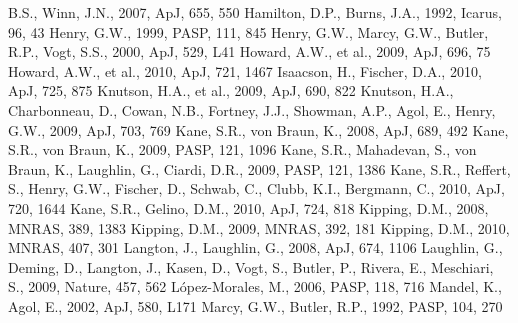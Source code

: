 \documentclass[12pt,preprint]{emulateapj}
\begin{document}
\begin{thebibliography}{}
  B.S., Winn, J.N., 2007, ApJ, 655, 550
  Hamilton, D.P., Burns, J.A., 1992, Icarus, 96, 43
 Henry, G.W.,
  1999, PASP, 111, 845
 Henry,
  G.W., Marcy, G.W., Butler, R.P., Vogt, S.S., 2000, ApJ, 529, L41
  Howard, A.W., et al., 2009, ApJ, 696, 75
  Howard, A.W., et al., 2010, ApJ, 721, 1467
  Isaacson, H., Fischer, D.A., 2010, ApJ, 725, 875
  Knutson, H.A., et al., 2009, ApJ, 690, 822
  Knutson, H.A., Charbonneau, D., Cowan, N.B., Fortney, J.J., Showman,
  A.P., Agol, E., Henry, G.W., 2009, ApJ, 703, 769
  Kane, S.R., von Braun, K., 2008, ApJ, 689, 492
  Kane, S.R., von Braun, K., 2009, PASP, 121, 1096
 Kane,
  S.R., Mahadevan, S., von Braun, K., Laughlin, G., Ciardi, D.R.,
  2009, PASP, 121, 1386
 Kane,
  S.R., Reffert, S., Henry, G.W., Fischer, D., Schwab, C., Clubb,
  K.I., Bergmann, C., 2010, ApJ, 720, 1644
 Kane,
  S.R., Gelino, D.M., 2010, ApJ, 724, 818
 Kipping, D.M.,
  2008, MNRAS, 389, 1383
 Kipping, D.M.,
  2009, MNRAS, 392, 181
 Kipping, D.M.,
  2010, MNRAS, 407, 301
  Langton, J., Laughlin, G., 2008, ApJ, 674, 1106
  Laughlin, G., Deming, D., Langton, J., Kasen, D., Vogt, S., Butler,
  P., Rivera, E., Meschiari, S., 2009, Nature, 457, 562
  L\'opez-Morales, M., 2006, PASP, 118, 716
  Mandel, K., Agol, E., 2002, ApJ, 580, L171
  Marcy, G.W., Butler, R.P., 1992, PASP, 104, 270

\end{thebibliography}
\end{document}

